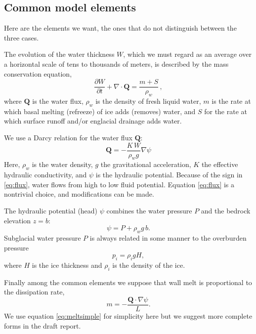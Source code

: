 \documentclass[11pt]{amsart}
\newcommand{\bQ}{\mathbf{Q}}
\begin{document}
\subsection*{Common model elements}  Here are the elements we want, the ones that do not distinguish between the three cases.

The evolution of the water thickness $W$, which we must regard as an average over a horizontal scale of tens to thousands of meters, is described by the mass conservation equation,
\begin{equation} \label{eq:conserve}
\frac{\partial W}{\partial t} + \nabla \cdot \bQ = \frac{m + S}{\rho_w}\, ,
\end{equation}
where $\bQ$ is the water flux, $\rho_w$ is the density of fresh liquid water, $m$ is the rate at which basal melting (refreeze) of ice adds (removes) water, and $S$ for the rate at which surface runoff and/or englacial drainage adds water.

We use a Darcy relation for the water flux $\bQ$:
\begin{equation} \label{eq:flux}
\bQ = - \frac{K \, W}{\rho_w g} \nabla \psi
\end{equation}
Here, $\rho_w$ is the water density, $g$ the gravitational acceleration, $K$ the effective hydraulic conductivity, and $\psi$ is the hydraulic potential.  Because of the sign in \eqref{eq:flux}, water flows from high to low fluid potential.  Equation \eqref{eq:flux} is a nontrivial choice, and modifications can be made.

The hydraulic potential (head) $\psi$ combines the water pressure $P$ and the bedrock elevation $z=b$:
\begin{equation} \label{eq:potential}
\psi = P + \rho_w g\, b.
\end{equation}
Subglacial water pressure $P$ is always related in some manner to the overburden pressure
\begin{equation}\label{eq:shallowoverburden}
  p_i = \rho_i g H,
\end{equation}
where $H$ is the ice thickness and $\rho_i$ is the density of the ice.

Finally among the common elements we suppose that wall melt is proportional to the dissipation rate,
\begin{equation}\label{eq:meltsimple}
   m = -\frac{\mathbf{Q} \cdot \nabla \psi}{L}.
\end{equation}
We use equation \eqref{eq:meltsimple} for simplicity here but we suggest more complete forms in the draft report.
\end{document}
